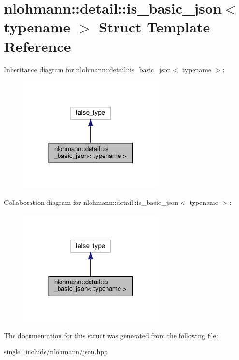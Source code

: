 \hypertarget{structnlohmann_1_1detail_1_1is__basic__json}{}\section{nlohmann\+:\+:detail\+:\+:is\+\_\+basic\+\_\+json$<$ typename $>$ Struct Template Reference}
\label{structnlohmann_1_1detail_1_1is__basic__json}


Inheritance diagram for nlohmann\+:\+:detail\+:\+:is\+\_\+basic\+\_\+json$<$ typename $>$\+:\nopagebreak
\begin{figure}[H]
\begin{center}
\leavevmode
\includegraphics[width=209pt]{structnlohmann_1_1detail_1_1is__basic__json__inherit__graph}
\end{center}
\end{figure}


Collaboration diagram for nlohmann\+:\+:detail\+:\+:is\+\_\+basic\+\_\+json$<$ typename $>$\+:\nopagebreak
\begin{figure}[H]
\begin{center}
\leavevmode
\includegraphics[width=209pt]{structnlohmann_1_1detail_1_1is__basic__json__coll__graph}
\end{center}
\end{figure}


The documentation for this struct was generated from the following file\+:\begin{DoxyCompactItemize}
\item 
single\+\_\+include/nlohmann/json.\+hpp\end{DoxyCompactItemize}

